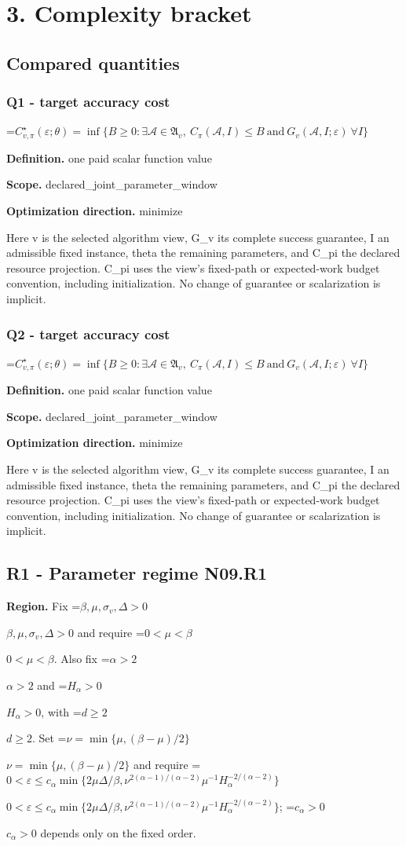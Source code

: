 \documentclass[10pt,a4paper]{article}
\newcommand{\AtlasMath}[1]{\par\begingroup\centering\setbox0=\hbox{$\displaystyle #1$}\ifdim\wd0>1.4\linewidth\typeout{ATLAS WIDE FORMULA: \the\wd0}\fi\ifdim\wd0>\linewidth\resizebox{\linewidth}{!}{\box0}\else\box0\fi\par\endgroup}
\newcommand{\AtlasInlineMath}[1]{\begingroup\setbox0=\hbox{$#1$}\ifdim\wd0>.4\linewidth\endgroup\AtlasMath{#1}\else\endgroup$#1$\fi}
\begin{document}
\section{3. Complexity bracket}
\subsection{Compared quantities}
\subsubsection{Q1 - target accuracy cost}
\AtlasMath{C^\star_{v,\pi}(\varepsilon;\theta)=\inf\{B\ge0:\exists\mathcal A\in\mathfrak A_v,\ C_\pi(\mathcal A,I)\le B\ \text{and}\ G_v(\mathcal A,I;\varepsilon)\ \forall I\}}
\textbf{Definition.} one paid scalar function value

\textbf{Scope.} declared\_joint\_parameter\_window

\textbf{Optimization direction.} minimize

Here v is the selected algorithm view, G\_v its complete success guarantee, I an admissible fixed instance, theta the remaining parameters, and C\_pi the declared resource projection. C\_pi uses the view's fixed-path or expected-work budget convention, including initialization. No change of guarantee or scalarization is implicit.

\subsubsection{Q2 - target accuracy cost}
\AtlasMath{C^\star_{v,\pi}(\varepsilon;\theta)=\inf\{B\ge0:\exists\mathcal A\in\mathfrak A_v,\ C_\pi(\mathcal A,I)\le B\ \text{and}\ G_v(\mathcal A,I;\varepsilon)\ \forall I\}}
\textbf{Definition.} one paid scalar function value

\textbf{Scope.} declared\_joint\_parameter\_window

\textbf{Optimization direction.} minimize

Here v is the selected algorithm view, G\_v its complete success guarantee, I an admissible fixed instance, theta the remaining parameters, and C\_pi the declared resource projection. C\_pi uses the view's fixed-path or expected-work budget convention, including initialization. No change of guarantee or scalarization is implicit.

\subsection{R1 - Parameter regime N09.R1}
\textbf{Region.} Fix \AtlasInlineMath{\beta,\mu,\sigma_v,\Delta>0} and require \AtlasInlineMath{0<\mu<\beta}. Also fix \AtlasInlineMath{\alpha>2} and \AtlasInlineMath{H_\alpha>0}, with \AtlasInlineMath{d\ge2}. Set \AtlasInlineMath{\nu=\min\{\mu,(\beta-\mu)/2\}} and require \AtlasInlineMath{0<\varepsilon\le c_\alpha\min\{2\mu\Delta/\beta,\nu^{2(\alpha-1)/(\alpha-2)}\mu^{-1}H_\alpha^{-2/(\alpha-2)}\}}; \AtlasInlineMath{c_\alpha>0} depends only on the fixed order.
\end{document}
